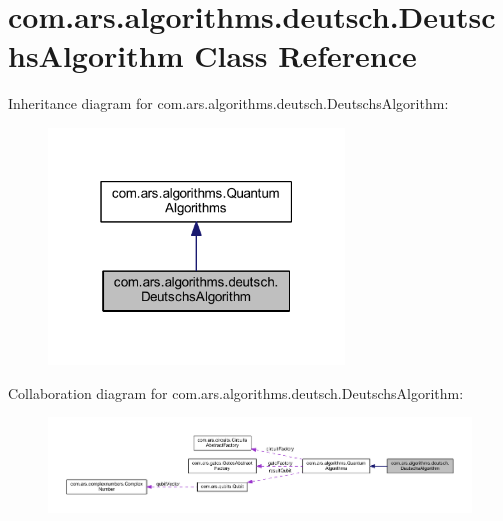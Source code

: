 \hypertarget{classcom_1_1ars_1_1algorithms_1_1deutsch_1_1_deutschs_algorithm}{}\section{com.\+ars.\+algorithms.\+deutsch.\+Deutschs\+Algorithm Class Reference}
\label{classcom_1_1ars_1_1algorithms_1_1deutsch_1_1_deutschs_algorithm}


Inheritance diagram for com.\+ars.\+algorithms.\+deutsch.\+Deutschs\+Algorithm\+:\nopagebreak
\begin{figure}[H]
\begin{center}
\leavevmode
\includegraphics[width=223pt]{classcom_1_1ars_1_1algorithms_1_1deutsch_1_1_deutschs_algorithm__inherit__graph}
\end{center}
\end{figure}


Collaboration diagram for com.\+ars.\+algorithms.\+deutsch.\+Deutschs\+Algorithm\+:
\nopagebreak
\begin{figure}[H]
\begin{center}
\leavevmode
\includegraphics[width=350pt]{classcom_1_1ars_1_1algorithms_1_1deutsch_1_1_deutschs_algorithm__coll__graph}
\end{center}
\end{figure}
